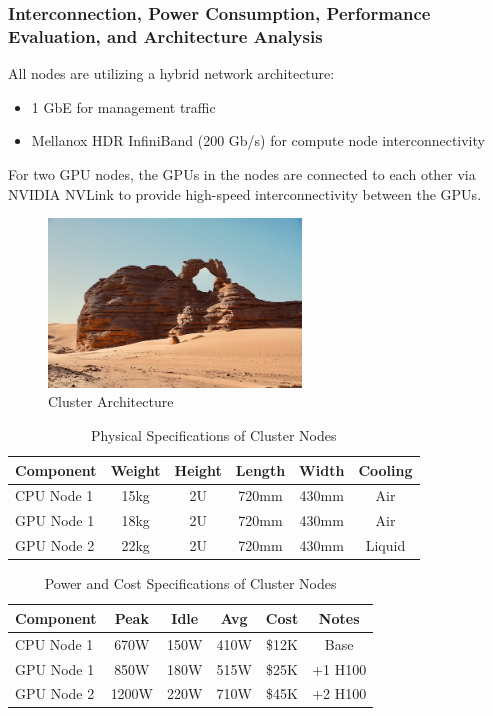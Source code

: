 \documentclass[a4paper,12pt]{article}
\begin{document}
\subsubsection{Interconnection, Power Consumption, Performance Evaluation, and Architecture Analysis}

All nodes are utilizing a hybrid network architecture:
\begin{itemize}
    \item 1 GbE for management traffic
    \item Mellanox HDR InfiniBand (200 Gb/s) for compute node interconnectivity
\end{itemize}

For two GPU nodes, the GPUs in the nodes are connected to each other via NVIDIA NVLink to provide high-speed interconnectivity between the GPUs.

\begin{figure}[H]
    \centering
    \includegraphics[width=0.6\textwidth]{Cluster_Architecture.png}
    \caption{Cluster Architecture}
    \label{fig:cluster_arch}
\end{figure}

\begin{table}[H]
\centering
\vspace{0.5cm}
\begin{tabular}{lccccc}  
\toprule
Component & Weight & Height & Length & Width & Cooling \\
\midrule 
CPU Node 1 & 15kg & 2U & 720mm & 430mm & Air \\
GPU Node 1 & 18kg & 2U & 720mm & 430mm & Air \\
GPU Node 2 & 22kg & 2U & 720mm & 430mm & Liquid \\
\bottomrule
\end{tabular}
\caption{Physical Specifications of Cluster Nodes}
\end{table}

\begin{table}[H] 
\centering
\vspace{0.5cm}
\begin{tabular}{lccccc}
\toprule
Component & Peak & Idle & Avg & Cost & Notes \\
\midrule
CPU Node 1 & 670W & 150W & 410W & \$12K & Base \\
GPU Node 1 & 850W & 180W & 515W & \$25K & +1 H100 \\
GPU Node 2 & 1200W & 220W & 710W & \$45K & +2 H100 \\
\bottomrule
\end{tabular}
\caption{Power and Cost Specifications of Cluster Nodes}
\end{table}
\end{document}
